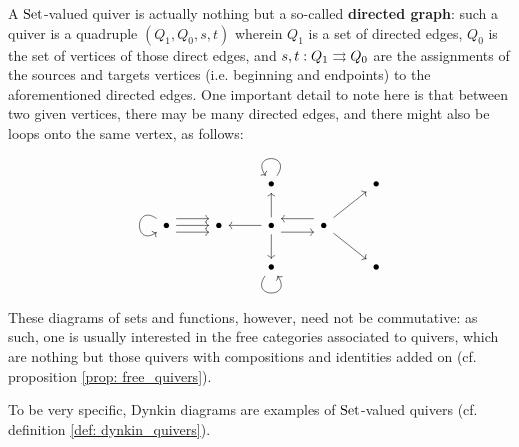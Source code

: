             \begin{example}
                A $\mathrm{Set}$-valued quiver is actually nothing but a so-called \textbf{directed graph}: such a quiver is a quadruple $(Q_1, Q_0, s, t)$ wherein $Q_1$ is a set of directed edges, $Q_0$ is the set of vertices of those direct edges, and $s, t: Q_1 \rightrightarrows Q_0$ are the assignments of the sources and targets vertices (i.e. beginning and endpoints) to the aforementioned directed edges. One important detail to note here is that between two given vertices, there may be many directed edges, and there might also be loops onto the same vertex, as follows:
                    $$
                        \begin{tikzcd}
                                                                                                                                           &         & \bullet \arrow[loop, distance=2em, in=125, out=55]             &                                                        & \bullet \\
                            \bullet \arrow[r, shift right=2] \arrow[r, shift left=2] \arrow[loop, distance=2em, in=215, out=145] \arrow[r] & \bullet & \bullet \arrow[r, shift right=2] \arrow[l] \arrow[u] \arrow[d] & \bullet \arrow[ru] \arrow[rd] \arrow[l, shift right=2] &         \\
                                                                                                                                           &         & \bullet \arrow[loop, distance=2em, in=305, out=235]            &                                                        & \bullet
                        \end{tikzcd}
                    $$
                These diagrams of sets and functions, however, need not be commutative: as such, one is usually interested in the free categories associated to quivers, which are nothing but those quivers with compositions and identities added on (cf. proposition \ref{prop: free_quivers}).
                
                To be very specific, Dynkin diagrams are examples of $\mathrm{Set}$-valued quivers (cf. definition \ref{def: dynkin_quivers}). 
            \end{example}
            \begin{proposition} \label{prop: sub_object_classifier_for_topos_of_quivers}
                
            \end{proposition}
